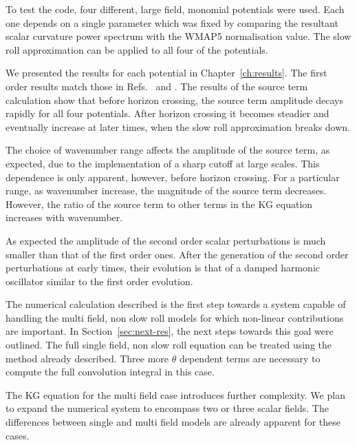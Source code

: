 To test the code, four different, large field, monomial potentials were used. Each
one depends on a single parameter which was fixed by comparing the resultant scalar
curvature power spectrum with the WMAP5 normalisation value. The slow roll
approximation can be applied to all four of the potentials.

We presented the results for each potential in Chapter~\ref{ch:results}. The first
order results match those in Refs.~\cite{Martin:2006rs, Ringeval:2007am} and
\cite{Salopek:1988qh}. The results of the source term calculation show that before
horizon crossing, the source term amplitude decays rapidly for all four potentials.
After horizon crossing it becomes steadier and eventually increase at later times,
when the slow roll approximation breaks down.

The choice of wavenumber range affects the amplitude of the source term, as
expected, due to the implementation of a sharp cutoff at large scales. This
dependence is only apparent, however, before horizon crossing. For a particular
range, as wavenumber increase, the magnitude of the source term decreases. However,
the ratio of the source term to other terms in the KG equation increases with
wavenumber. 

As expected the amplitude of the second order scalar perturbations is much smaller
than that of the first order ones. After the generation of the second order
perturbations at early times, their evolution is that of a damped harmonic
oscillator similar to the first order evolution.


The numerical calculation described is the first step towards a system capable of
handling the multi field, non slow roll models for which non-linear contributions
are important. In Section~\ref{sec:next-res}, the next steps towards this goal were
outlined. The full single field, non slow roll equation can be treated using the
method already described. Three more $\theta$ dependent terms are necessary to
compute the full convolution integral in this case. 

The KG equation for the multi field case introduces further complexity. We plan to
expand the numerical system to encompass two or three scalar fields. The differences
between single and multi field models are already apparent for these cases.